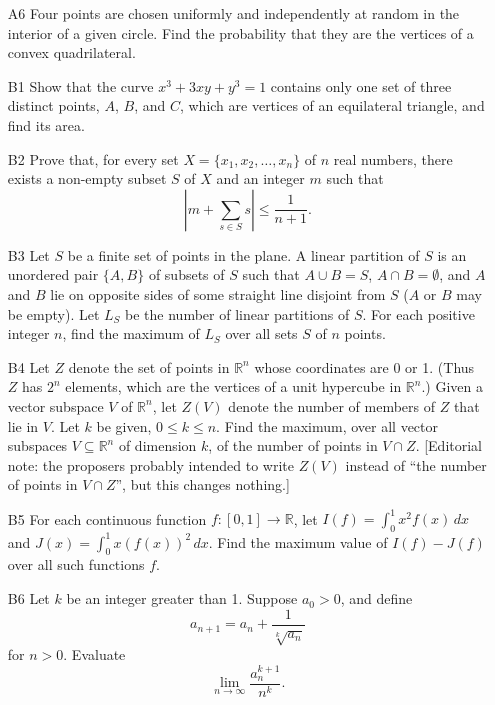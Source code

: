 \documentclass[amssymb,twocolumn,pra,10pt,aps]{revtex4-1}
\begin{document}
\begin{itemize}
\item[A6]
Four points are chosen uniformly and independently at random in the interior
of a given circle. Find the probability that they are the vertices
of a convex quadrilateral.

\item[B1]
Show that the curve $x^3 + 3xy + y^3 = 1$ contains only one set of three
distinct points, $A$, $B$, and $C$, which are vertices of an equilateral
triangle, and find its area.

\item[B2]
Prove that, for every set $X = \{x_1, x_2, \dots, x_n\}$ of $n$
real numbers, there exists a non-empty subset $S$ of $X$ and an integer $m$
such that
\[
\left| m + \sum_{s \in S} s \right| \leq \frac{1}{n+1}.
\]

\item[B3]
Let $S$ be a finite set of points in the plane. A linear partition of $S$
is an unordered pair $\{A,B\}$ of subsets of $S$ such that $A \cup B = S$,
$A \cap B = \emptyset$, and $A$ and $B$ lie on opposite sides of some
straight line disjoint from $S$ ($A$ or $B$ may be empty). Let $L_S$ be the
number of linear partitions of $S$. For each positive integer $n$, find the
maximum of $L_S$ over all sets $S$ of $n$ points.

\item[B4]
Let $Z$ denote the set of points in $\mathbb{R}^n$ whose coordinates are 0
or 1. (Thus $Z$ has $2^n$ elements, which are the vertices of a unit
hypercube in $\mathbb{R}^n$.) Given a vector subspace $V$
of $\mathbb{R}^n$, let $Z(V)$
denote the number of members of $Z$ that lie in $V$. Let $k$ be given,
$0 \leq k \leq n$. Find the maximum, over all vector subspaces $V
\subseteq \mathbb{R}^n$ of dimension $k$, of the number of points in
$V \cap Z$. [Editorial note: the proposers probably intended to write
$Z(V)$ instead of
``the number of points in $V \cap Z$'', but this changes nothing.]

\item[B5]
For each continuous function $f: [0,1] \to \mathbb{R}$, let $I(f) =
\int_0^1 x^2 f(x)\,dx$ and $J(x) = \int_0^1 x \left(f(x)\right)^2\,dx$.
Find the maximum value of $I(f) - J(f)$ over all such functions $f$.

\item[B6]
Let $k$ be an integer greater than 1. Suppose $a_0 > 0$, and define
\[
a_{n+1} = a_n + \frac{1}{\sqrt[k]{a_n}}
\]
for $n > 0$. Evaluate
\[
\lim_{n \to \infty} \frac{a_n^{k+1}}{n^k}.
\]
\end{itemize}
\end{document}
